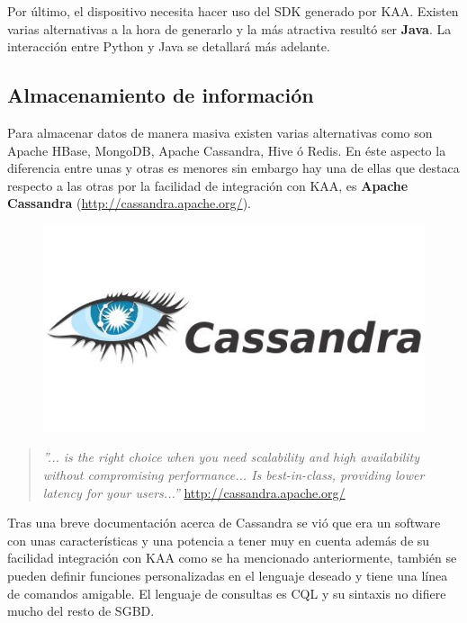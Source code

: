 \bigskip
Por último, el dispositivo necesita hacer uso del SDK generado por KAA. Existen varias alternativas a la hora de generarlo y la más atractiva resultó ser \textbf{Java}. La interacción entre Python y Java se detallará más adelante.

\subsection{Almacenamiento de información}

Para almacenar datos de manera masiva existen varias alternativas como son Apache HBase, MongoDB, Apache Cassandra, Hive ó Redis. En éste aspecto la diferencia entre unas y otras es menores sin embargo hay una de ellas que destaca respecto a las otras por la facilidad de integración con KAA, es \textbf{Apache Cassandra} (\url{http://cassandra.apache.org/}).

\begin{figure}[!ht]
  \begin{center}
    \includegraphics[scale=0.60]{../images/cassandra/logo.jpg}
    \label{fig:cassalog}
	\end{center}
\end{figure}

\begin{quote}\textit{ ''... is the right choice when you need scalability and high availability without compromising performance... Is best-in-class, providing lower latency for your users...''
}
\newline
\url{http://cassandra.apache.org/}
\end{quote}

Tras una breve documentación acerca de Cassandra se vió que era un software con unas características y una potencia a tener muy en cuenta además de su facilidad integración con KAA como se ha mencionado anteriormente, también se pueden definir funciones personalizadas en el lenguaje deseado y tiene una línea de comandos amigable. El lenguaje de consultas es CQL y su sintaxis no difiere mucho del resto de SGBD.



